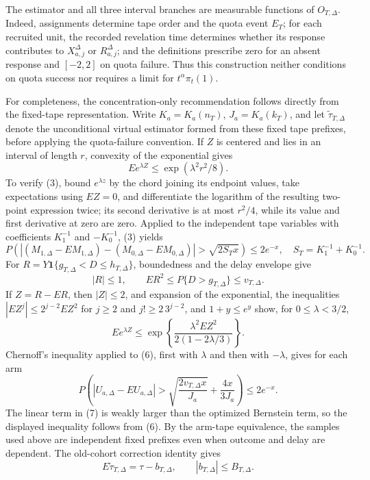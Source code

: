 The estimator and all three interval branches are measurable functions of \(O_{T,\Delta}\).  Indeed, assignments determine tape order and the quota event \(E_T\); for each recruited unit, the recorded revelation time determines whether its response contributes to \(X_{a,j}^{\Delta}\) or \(R_{a,j}^{\Delta}\); and the definitions prescribe zero for an absent response and \([-2,2]\) on quota failure.  Thus this construction neither conditions on quota success nor requires a limit for \(t^\alpha\pi_t(1)\).

For completeness, the concentration-only recommendation follows directly from the fixed-tape representation.  Write \(K_a=K_a(n_T)\), \(J_a=K_a(k_T)\), and let \(\widetilde\tau_{T,\Delta}\) denote the unconditional virtual estimator formed from these fixed tape prefixes, before applying the quota-failure convention.  If \(Z\) is centered and lies in an interval of length \(r\), convexity of the exponential gives
\[
 E e^{\lambda Z}\leq \exp(\lambda^2r^2/8).
 \tag{3}
\]
To verify (3), bound \(e^{\lambda z}\) by the chord joining its endpoint values, take expectations using \(EZ=0\), and differentiate the logarithm of the resulting two-point expression twice; its second derivative is at most \(r^2/4\), while its value and first derivative at zero are zero.  Applied to the independent tape variables with coefficients \(K_1^{-1}\) and \(-K_0^{-1}\), (3) yields
\[
 P\!\left(\left|(M_{1,\Delta}-EM_{1,\Delta})-(M_{0,\Delta}-EM_{0,\Delta})\right|>
 \sqrt{2S_Tx}\right)\leq2e^{-x},
 \quad S_T=K_1^{-1}+K_0^{-1}.
 \tag{4}
\]
For \(R=Y\mathbf 1\{g_{T,\Delta}<D\leq h_{T,\Delta}\}\), boundedness and the delay envelope give
\[
 |R|\leq1,\qquad E R^2\leq P\{D>g_{T,\Delta}\}\leq v_{T,\Delta}.
 \tag{5}
\]
If \(Z=R-ER\), then \(|Z|\leq2\), and expansion of the exponential, the inequalities \(|EZ^j|\leq2^{j-2}EZ^2\) for \(j\geq2\) and \(j!\geq2\,3^{j-2}\), and \(1+y\leq e^y\) show, for \(0\leq\lambda<3/2\),
\[
 E e^{\lambda Z}
 \leq \exp\!\left\{\frac{\lambda^2EZ^2}{2(1-2\lambda/3)}\right\}.
 \tag{6}
\]
Chernoff's inequality applied to (6), first with \(\lambda\) and then with \(-\lambda\), gives for each arm
\[
 P\!\left(\left|U_{a,\Delta}-EU_{a,\Delta}\right|>
 \sqrt{\frac{2v_{T,\Delta}x}{J_a}}+\frac{4x}{3J_a}\right)\leq2e^{-x}.
 \tag{7}
\]
The linear term in (7) is weakly larger than the optimized Bernstein term, so the displayed inequality follows from (6).  By the arm-tape equivalence, the samples used above are independent fixed prefixes even when outcome and delay are dependent.  The old-cohort correction identity gives
\[
 E\widetilde\tau_{T,\Delta}=\tau-b_{T,\Delta},
 \qquad |b_{T,\Delta}|\leq B_{T,\Delta}.
 \tag{8}
\]
